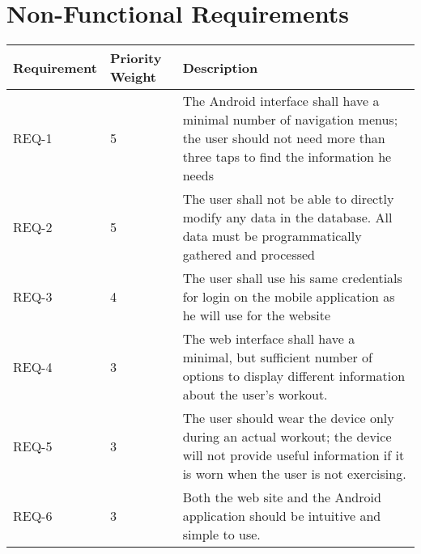 \documentclass{article}
\begin{document}
\section{Non-Functional Requirements}

\begin{center}
	\begin{tabular}{|C{2cm}|C{2cm}|C{8cm}|}
		\hline
			Requirement & Priority Weight & Description \\
		\hline
			REQ-1 & 5 & The Android interface shall have a minimal number of navigation menus; the user should not need more than three taps to find the information he needs \\
		\hline
			REQ-2 & 5 & The user shall not be able to directly modify any data in the database. All data must be programmatically gathered and processed \\
		\hline
			REQ-3 & 4 & The user shall use his same credentials for login on the mobile application as he will use for the website \\
		\hline
			REQ-4 & 3 & The web interface shall have a minimal, but sufficient number of options to display different information about the user's workout. \\
		\hline
			REQ-5 & 3 & The user should wear the device only during an actual workout; the device will not provide useful information if it is worn when the user is not exercising. \\
		\hline	
			REQ-6 & 3 & Both the web site and the Android application should be intuitive and simple to use. \\
		\hline
	\end{tabular}
\end{center}
\end{document}
